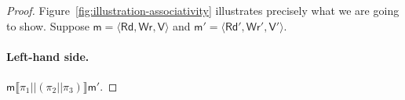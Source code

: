 \documentclass{llncs}
\newcommand{\modl}{\mathsf m}
\newcommand{\pll}{ {||} }							%
\newcommand{\readset}{\mathsf{Rd}}
\newcommand{\valuset}{\mathsf{V}}
\newcommand{\writeset}{\mathsf{Wr}}
\newcommand{\intPgm}[1]{\llbracket #1 \rrbracket}
\newcommand{\tuple}[1]{ \langle #1 \rangle}
\begin{document}
\begin{proof}


Figure~\ref{fig:illustration-associativity} illustrates precisely what we are going to show.
Suppose $\modl = \tuple{\readset, \writeset, \valuset}$ and $\modl' = \tuple{\readset', \writeset', \valuset'}$.




\paragraph{Left-hand side.} $\modl \intPgm{ \pi_1 \pll (\pi_2 \pll \pi_3) } \modl'$.


\end{proof}
\end{document}
